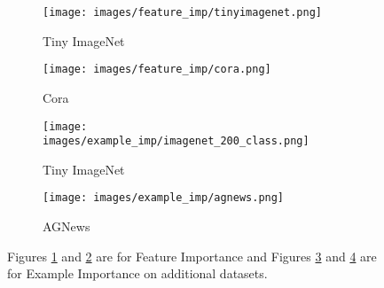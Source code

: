 \begin{figure}[!htb]
    \centering
    \begin{minipage}{.98\textwidth}
        \centering
        \begin{subfigure}[b]{0.24\linewidth}
            \texttt{[image: images/feature\_imp/tinyimagenet.png]}
            \caption{Tiny ImageNet}\label{fig:tinyimgnet}
        \end{subfigure}
        \begin{subfigure}[b]{0.24\linewidth}
            \texttt{[image: images/feature\_imp/cora.png]} 
            \caption{Cora}\label{fig:cora}
        \end{subfigure}
        \begin{subfigure}[b]{0.24\linewidth}
            \texttt{[image: images/example\_imp/imagenet\_200\_class.png]}
            \caption{Tiny ImageNet}\label{fig:tinyimgnetce}
        \end{subfigure}
        \begin{subfigure}[b]{0.24\linewidth}
            \texttt{[image: images/example\_imp/agnews.png]} 
            \caption{AGNews}\label{fig:agnews}
        \end{subfigure}
        \caption{ Figures \ref{fig:tinyimgnet} and \ref{fig:cora} are for Feature Importance and Figures \ref{fig:tinyimgnetce} and \ref{fig:agnews} are for Example Importance on additional datasets.}
        \label{fig:prob1_6_2}
    \end{minipage}%
\end{figure}


